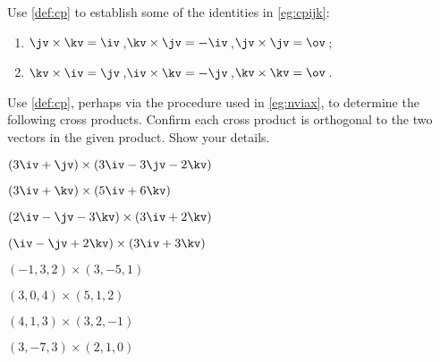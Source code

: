 





\sectionExercises


\begin{exercise} \label{ex:cpijk} 
Use \cref{def:cp} to establish some of the  identities in \cref{eg:cpijk}: 
%
\begin{enumerate}
\item \(\jv\times\kv=\iv\)\,,\quad \(\kv\times\jv=-\iv\)\,,\quad \(\jv\times\jv=\ov\)\,;
\item \(\kv\times\iv=\jv\)\,,\quad \(\iv\times\kv=-\jv\)\,,\quad \(\kv\times\kv=\ov\)\,.
\end{enumerate}
\end{exercise}





\begin{exercise}  
Use \cref{def:cp}, perhaps via the procedure used in \cref{eg:nviax}, to determine the following cross products. 
Confirm each cross product is orthogonal to the two vectors in the given product.
Show your details.
\begin{Parts}
\item \((3\iv+\jv)\times(3\iv -3\jv -2\kv)\)
\answer{\(-2\iv +6\jv -12\kv\)}
\item \((3\iv  +\kv)\times(5\iv +6 \kv)\)
\answer{\(-13\jv\)}
\begin{reduce}
\item \((2\iv-\jv -3\kv)\times(3\iv +2\kv)\)
\answer{\(-2\iv -13\jv +3\kv\)}
\item \((\iv -\jv +2\kv)\times(3\iv  +3\kv)\)
\answer{\(-3\iv +3\jv +3\kv\)}
\item \((-1,3,2)\times(3,-5,1)\)
\item \((3,0,4)\times(5,1,2)\)
\end{reduce}
\item \((4,1,3)\times(3,2,-1)\)
\item \((3,-7,3)\times(2,1,0)\)
\end{Parts}
\end{exercise}





